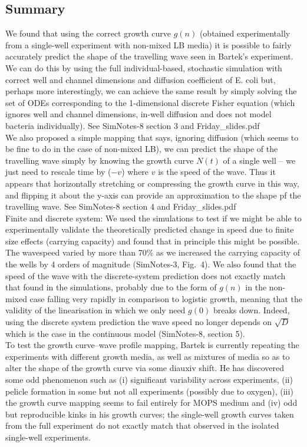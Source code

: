 \documentclass[a4paper,10pt]{article}
\begin{document}
\subsection{Summary}
We found that using the correct growth curve $g(n)$ (obtained experimentally from a single-well experiment with non-mixed LB media) it is possible to fairly accurately 
predict the shape of the travelling wave seen in Bartek's experiment. We can do this by using the full individual-based, stochastic simulation with correct well and 
channel dimensions and diffusion coefficient of E. coli but, 
perhaps more interestingly, we can achieve the same result by simply solving the set of ODEs corresponding to the 1-dimensional discrete Fisher equation (which ignores well 
and channel dimensions, in-well diffusion and does not model bacteria individually). See SimNotes-8 section 3 and Friday\_slides.pdf \\

We also proposed a simple mapping that says, ignoring diffusion (which seems to be fine to do in the case of non-mixed LB), we can predict the shape of the travelling wave simply by 
knowing the growth curve $N(t)$ of a single well – we just need to rescale time by ($-v$) where $v$ is the speed of the wave. Thus it appears that horizontally stretching or compressing the 
growth curve in this way, and flipping it about the y-axis can provide an approximation to the shape pf the travelling wave. See SimNotes-8 section 4 and Friday\_slides.pdf\\

Finite and discrete system: We used the simulations to test if we might be able to experimentally validate the theoretically predicted change in speed due to finite size effects 
(carrying capacity) and found that in principle this might be possible. The wavespeed varied by more than 70\% as we increased the carrying capacity of the wells
by 4 orders of magnitude (SimNotes-3, Fig.~4).
We also found that the speed of the wave with the discrete-system prediction does not exactly match that found in the simulations, 
probably due to the form of $g(n)$ in the non-mixed case falling very rapidly in comparison to logistic growth, meaning that the validity of the linearisation in which we only need $g(0)$ breaks down.
Indeed, using the discrete system prediction the wave speed no longer depends on $\sqrt{D}$ which is the case in the continuous model (SimNotes-8, section 5).\\

To test the growth curve--wave profile mapping, Bartek is currently repeating the experiments with different growth media, as well as mixtures of media so as to alter the shape 
of the growth curve via some diauxiv shift. He has discovered some odd phenomenon such as (i) significant variability across experiments,
(ii) pelicle formation in some but not all experiments (possibly due to oxygen), (iii) the growth curve mapping seems to fail entirely for MOPS medium and
(iv) odd but reproducible kinks in his growth curves; the single-well growth curves taken from the full experiment do not exactly match that observed in the 
isolated single-well experiments.\\
\end{document}
